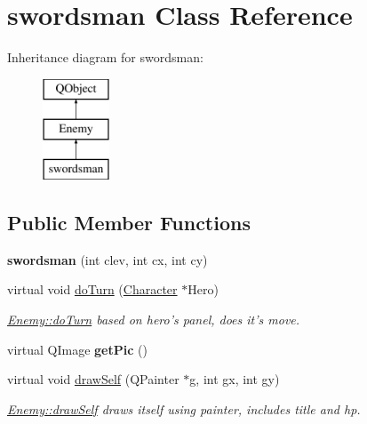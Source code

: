 \hypertarget{classswordsman}{\section{swordsman Class Reference}
\label{classswordsman}
}
Inheritance diagram for swordsman\-:\begin{figure}[H]
\begin{center}
\leavevmode
\includegraphics[height=3.000000cm]{classswordsman}
\end{center}
\end{figure}
\subsection*{Public Member Functions}
\begin{DoxyCompactItemize}
\item 
\hypertarget{classswordsman_afa4407146d49326932f9b1fa4f97ab2d}{{\bfseries swordsman} (int clev, int cx, int cy)}\label{classswordsman_afa4407146d49326932f9b1fa4f97ab2d}

\item 
virtual void \hyperlink{classswordsman_a99dec33c47dc5f3936229e5045b9c235}{do\-Turn} (\hyperlink{class_character}{Character} $\ast$Hero)
\begin{DoxyCompactList}\small\item\em \hyperlink{class_enemy_a56e4b9b07e8cd2a4e5ecfa8ff5b9265a}{Enemy\-::do\-Turn} based on hero's panel, does it's move. \end{DoxyCompactList}\item 
\hypertarget{classswordsman_a68098988c90a499ebfb757c7750bae7f}{virtual Q\-Image {\bfseries get\-Pic} ()}\label{classswordsman_a68098988c90a499ebfb757c7750bae7f}

\item 
virtual void \hyperlink{classswordsman_ad897e7c34033347faa5e4022b27cc395}{draw\-Self} (Q\-Painter $\ast$g, int gx, int gy)
\begin{DoxyCompactList}\small\item\em \hyperlink{class_enemy_a3251244e8e7ac657687d6be5a8da71bb}{Enemy\-::draw\-Self} draws itself using painter, includes title and hp. \end{DoxyCompactList}\end{DoxyCompactItemize}
